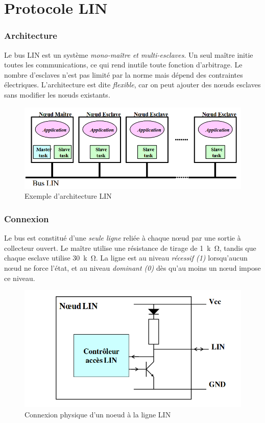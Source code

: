 \section{Protocole LIN}

\subsubsection*{Architecture}  
Le bus LIN est un système \textit{mono-maître et multi-esclaves}. Un seul maître initie toutes les communications, ce qui rend inutile toute fonction d'arbitrage. Le nombre d'esclaves n'est pas limité par la norme mais dépend des contraintes électriques. L'architecture est dite \textit{flexible}, car on peut ajouter des nœuds esclaves sans modifier les nœuds existants.  

\begin{figure}[H]
    \centering
    \includegraphics[width=0.8\linewidth]{images//Intro/Architecture_LIN_ME.png}
    \caption{Exemple d'architecture LIN}
    \label{fig:placeholder}
\end{figure}

\subsubsection*{Connexion}  
Le bus est constitué d'une \textit{seule ligne} reliée à chaque nœud par une sortie à collecteur ouvert. Le maître utilise une résistance de tirage de \SI{1}{k\ohm}, tandis que chaque esclave utilise \SI{30}{k\ohm}. La ligne est au niveau \textit{récessif (1)} lorsqu'aucun nœud ne force l'état, et au niveau \textit{dominant (0)} dès qu'au moins un nœud impose ce niveau.  

\begin{figure}[H]
    \centering
    \includegraphics[width=0.5\linewidth]{images//Intro/Connection_LIN.png}
    \caption{Connexion physique d'un noeud à la ligne LIN}
    \label{fig:placeholder}
\end{figure}


